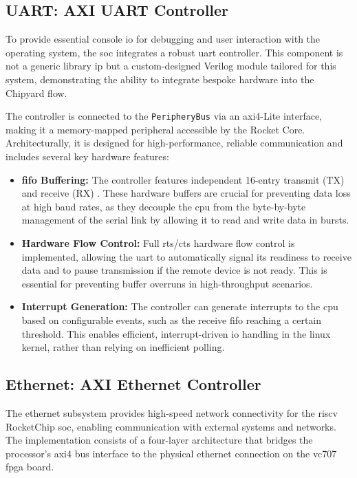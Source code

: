 \subsection{UART: AXI UART Controller}

To provide essential console \acrshort{io} for debugging and user interaction with the operating system, the \acrshort{soc} integrates a robust \acrshort{uart} controller. This component is not a generic library \acrshort{ip} but a custom-designed Verilog module tailored for this system, demonstrating the ability to integrate bespoke hardware into the Chipyard flow.

The controller is connected to the \texttt{PeripheryBus} via an \acrshort{axi4}-Lite interface, making it a memory-mapped peripheral accessible by the Rocket Core. Architecturally, it is designed for high-performance, reliable communication and includes several key hardware features:
\begin{itemize}
    \item \textbf{\acrshort{fifo} Buffering:} The controller features independent 16-entry transmit (TX) and receive (RX) . These hardware buffers are crucial for preventing data loss at high baud rates, as they decouple the \acrshort{cpu} from the byte-by-byte management of the serial link by allowing it to read and write data in bursts.
    \item \textbf{Hardware Flow Control:} Full \acrshort{rts}/\acrshort{cts} hardware flow control is implemented, allowing the \acrshort{uart} to automatically signal its readiness to receive data and to pause transmission if the remote device is not ready. This is essential for preventing buffer overruns in high-throughput scenarios.
    \item \textbf{Interrupt Generation:} The controller can generate interrupts to the \acrshort{cpu} based on configurable events, such as the receive \acrshort{fifo} reaching a certain threshold. This enables efficient, interrupt-driven \acrshort{io} handling in the \acrshort{linux} kernel, rather than relying on inefficient polling.
\end{itemize}

\subsection{Ethernet: AXI Ethernet Controller}

The \acrshort{ethernet} subsystem provides high-speed network connectivity for the \acrshort{riscv} RocketChip \acrshort{soc}, enabling communication with external systems and networks. The implementation consists of a four-layer architecture that bridges the processor's \acrshort{axi4} bus interface to the physical \acrshort{ethernet} connection on the \acrshort{vc707} \acrshort{fpga} board.

